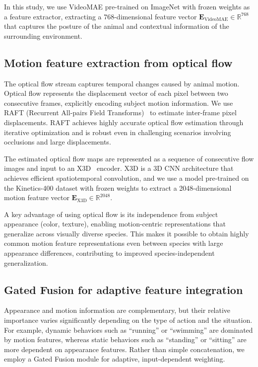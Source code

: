 \documentclass[twocolumn]{svjour3}
\begin{document}
In this study, we use VideoMAE pre-trained on ImageNet with frozen weights as a feature extractor, extracting a 768-dimensional feature vector $\mathbf{E}_{\mathrm{VideoMAE}} \in \mathbb{R}^{768}$ that captures the posture of the animal and contextual information of the surrounding environment.

\subsection{Motion feature extraction from optical flow}

The optical flow stream captures temporal changes caused by animal motion.
Optical flow represents the displacement vector of each pixel between two consecutive frames, explicitly encoding subject motion information.
We use RAFT (Recurrent All-pairs Field Transforms)~\cite{teed2020raft} to estimate inter-frame pixel displacements.
RAFT achieves highly accurate optical flow estimation through iterative optimization and is robust even in challenging scenarios involving occlusions and large displacements.

The estimated optical flow maps are represented as a sequence of consecutive flow images and input to an X3D~\cite{feichtenhofer2020x3d} encoder.
X3D is a 3D CNN architecture that achieves efficient spatiotemporal convolution, and we use a model pre-trained on the Kinetics-400 dataset with frozen weights to extract a 2048-dimensional motion feature vector $\mathbf{E}_{\mathrm{X3D}} \in \mathbb{R}^{2048}$.

A key advantage of using optical flow is its independence from subject appearance (color, texture), enabling motion-centric representations that generalize across visually diverse species.
This makes it possible to obtain highly common motion feature representations even between species with large appearance differences, contributing to improved species-independent generalization.

\subsection{Gated Fusion for adaptive feature integration}

Appearance and motion information are complementary, but their relative importance varies significantly depending on the type of action and the situation.
For example, dynamic behaviors such as ``running'' or ``swimming'' are dominated by motion features, whereas static behaviors such as ``standing'' or ``sitting'' are more dependent on appearance features.
Rather than simple concatenation, we employ a Gated Fusion module for adaptive, input-dependent weighting.
\end{document}
